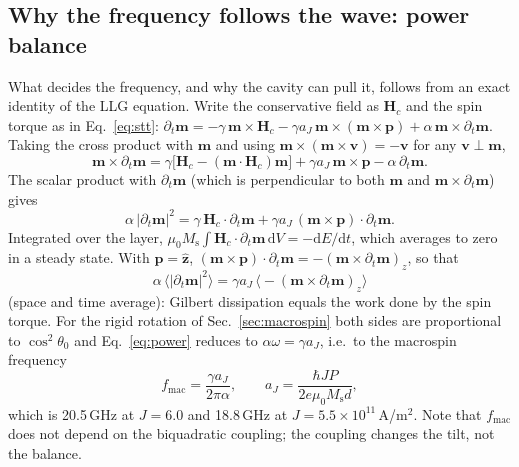 \documentclass[11pt,a4paper]{article}
\newcommand{\vect}[1]{\mathbf{#1}}
\newcommand{\uv}[1]{\hat{\mathbf{#1}}}
\newcommand{\Ms}{M_\mathrm{s}}
\newcommand{\dd}{\mathrm{d}}
\begin{document}
\subsection{Why the frequency follows the wave: power balance}
\label{sec:power}
What decides the frequency, and why the cavity can pull it, follows from an exact identity of the LLG equation.
Write the conservative field as $\vect H_c$ and the spin torque as in Eq.~\eqref{eq:stt}:
$\partial_t\vect m=-\gamma\,\vect m\times\vect H_c-\gamma a_J\,\vect m\times(\vect m\times\vect p)
+\alpha\,\vect m\times\partial_t\vect m$.
Taking the cross product with $\vect m$ and using $\vect m\times(\vect m\times\vect v)=-\vect v$ for any
$\vect v\perp\vect m$,
\begin{equation}
\vect m\times\partial_t\vect m=\gamma\big[\vect H_c-(\vect m\cdot\vect H_c)\vect m\big]
+\gamma a_J\,\vect m\times\vect p-\alpha\,\partial_t\vect m .
\end{equation}
The scalar product with $\partial_t\vect m$ (which is perpendicular to both $\vect m$ and
$\vect m\times\partial_t\vect m$) gives
\begin{equation}
\alpha\,|\partial_t\vect m|^2=\gamma\,\vect H_c\cdot\partial_t\vect m
+\gamma a_J\,(\vect m\times\vect p)\cdot\partial_t\vect m .
\end{equation}
Integrated over the layer, $\mu_0\Ms\int\vect H_c\cdot\partial_t\vect m\,\dd V=-\dd E/\dd t$, which averages to
zero in a steady state.  With $\vect p=\uv z$, $(\vect m\times\vect p)\cdot\partial_t\vect m
=-(\vect m\times\partial_t\vect m)_z$, so that
\begin{equation}
\boxed{\;\alpha\,\big\langle|\partial_t\vect m|^2\big\rangle
=\gamma a_J\,\big\langle-(\vect m\times\partial_t\vect m)_z\big\rangle\;}
\label{eq:power}
\end{equation}
(space and time average): Gilbert dissipation equals the work done by the spin torque.  For the rigid rotation
of Sec.~\ref{sec:macrospin} both sides are proportional to $\cos^2\theta_0$ and Eq.~\eqref{eq:power} reduces to
$\alpha\omega=\gamma a_J$, i.e.\ to the macrospin frequency
\begin{equation}
f_\mathrm{mac}=\frac{\gamma a_J}{2\pi\alpha},\qquad a_J=\frac{\hbar JP}{2e\mu_0\Ms d},
\end{equation}
which is 20.5\,GHz at $J=6.0$ and 18.8\,GHz at $J=5.5\times10^{11}$\,A/m$^2$.
Note that $f_\mathrm{mac}$ does not depend on the biquadratic coupling; the coupling changes the tilt, not the
balance.
\end{document}

